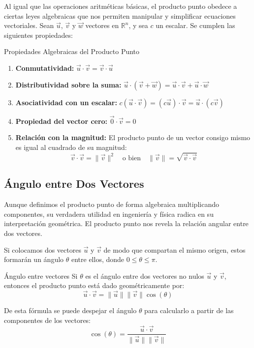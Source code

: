 Al igual que las operaciones aritméticas básicas, el producto punto obedece a ciertas leyes algebraicas que nos permiten manipular y simplificar ecuaciones vectoriales. Sean $\vec{u}$, $\vec{v}$ y $\vec{w}$ vectores en $\mathbb{R}^n$, y sea $c$ un escalar. Se cumplen las siguientes propiedades:

\begin{mytheorem}{Propiedades Algebraicas del Producto Punto}
\begin{enumerate}
    \item \textbf{Conmutatividad:} $\vec{u} \cdot \vec{v} = \vec{v} \cdot \vec{u}$
    \item \textbf{Distributividad sobre la suma:} $\vec{u} \cdot (\vec{v} + \vec{w}) = \vec{u} \cdot \vec{v} + \vec{u} \cdot \vec{w}$
    \item \textbf{Asociatividad con un escalar:} $c(\vec{u} \cdot \vec{v}) = (c\vec{u}) \cdot \vec{v} = \vec{u} \cdot (c\vec{v})$
    \item \textbf{Propiedad del vector cero:} $\vec{0} \cdot \vec{v} = 0$
    \item \textbf{Relación con la magnitud:} El producto punto de un vector consigo mismo es igual al cuadrado de su magnitud:
    \[ \vec{v} \cdot \vec{v} = \|\vec{v}\|^2 \quad \text{o bien} \quad \|\vec{v}\| = \sqrt{\vec{v} \cdot \vec{v}} \]
\end{enumerate}
\end{mytheorem}

\subsection{Ángulo entre Dos Vectores}

Aunque definimos el producto punto de forma algebraica multiplicando componentes, su verdadera utilidad en ingeniería y física radica en su interpretación geométrica. El producto punto nos revela la relación angular entre dos vectores.

Si colocamos dos vectores $\vec{u}$ y $\vec{v}$ de modo que compartan el mismo origen, estos formarán un ángulo $\theta$ entre ellos, donde $0 \leq \theta \leq \pi$.

\begin{mytheorem}{Ángulo entre vectores}
Si $\theta$ es el ángulo entre dos vectores no nulos $\vec{u}$ y $\vec{v}$, entonces el producto punto está dado geométricamente por:
\[ \vec{u} \cdot \vec{v} = \|\vec{u}\| \|\vec{v}\| \cos(\theta) \]

De esta fórmula se puede despejar el ángulo $\theta$ para calcularlo a partir de las componentes de los vectores:
\[ \cos(\theta) = \frac{\vec{u} \cdot \vec{v}}{\|\vec{u}\| \|\vec{v}\|} \]
\end{mytheorem}


